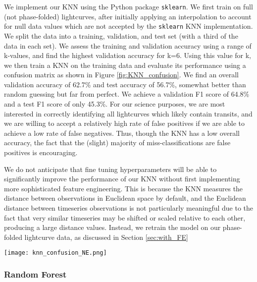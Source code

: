\documentclass{article}
\begin{document}
We implement our KNN using the Python package \texttt{sklearn}. We first train on full (not phase-folded) lightcurves, after initially applying an interpolation to account for null data values which are not accepted by the \texttt{sklearn} KNN implementation. We split the data into a training, validation, and test set (with a third of the data in each set). We assess the training and validation accuracy using a range of k-values, and find the highest validation accuracy for k=6. Using this value for k, we then train a KNN on the training data and evaluate its performance using a confusion matrix 
as shown in Figure \ref{fig:KNN_confusion}. We find an overall validation accuracy of 62.7\% and test accuracy of 56.7\%, somewhat better than random guessing but far from perfect. We achieve a validation F1 score of 64.8\% and a test F1 score of only 45.3\%. For our science purposes, we are most interested in correctly identifying all lightcurves which likely contain transits, and we are willing to accept a relatively high rate of false positives if we are able to achieve a low rate of false negatives. Thus, though the KNN has a low overall accuracy, the fact that the (slight) majority of miss-classifications are false positives is encouraging. 

We do not anticipate that fine tuning hyperparameters will be able to significantly improve the performance of our KNN without first implementing more sophisticated feature engineering.
This is because the KNN measures the distance between observations in Euclidean space by default, and the Euclidean distance between timeseries observations is not particularly meaningful due to the fact that very similar timeseries may be shifted or scaled relative to each other, producing a large distance values. Instead, we retrain the model on our phase-folded lightcurve data, as discussed in Section \ref{sec:with_FE}


\begin{figure*}[ht]
\centering
\texttt{[image: knn\_confusion\_NE.png]}
\caption{A confusion matrix for our KNN classifier trained using k=6. The classifier is far from perfect, as expected given the application of standard distance metrics.}
\label{fig:KNN_confusion}
\end{figure*}

\subsubsection{Random Forest}
\end{document}
